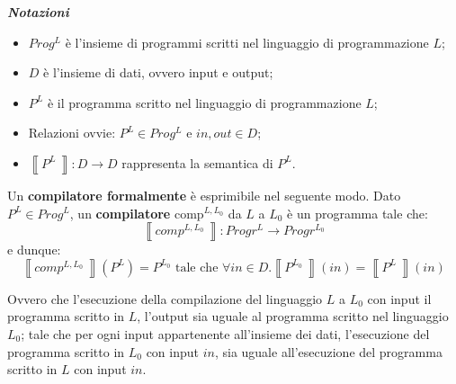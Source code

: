\documentclass[a4paper]{article}
\newcommand{\exec}[1]{\left\llbracket #1\:\right\rrbracket}
\begin{document}
	\noindent
	\begin{boxdef}
		\begin{center}
			\textcolor{Red3}{\textbf{\emph{Notazioni}}}
		\end{center}
		\begin{itemize}
			\item $Prog^{L}$ è l'insieme di programmi scritti nel linguaggio di programmazione $L$;
			\item $D$ è l'insieme di dati, ovvero input e output;
			\item $P^{L}$ è il programma scritto nel linguaggio di programmazione $L$;
			\item Relazioni ovvie: $P^{L} \in Prog^{L}$ e $in, out \in D$;
			\item $\exec{P^{L}}: D \longrightarrow D$ rappresenta la semantica di $P^{L}$.
		\end{itemize}
	\end{boxdef}\:\newline

	\noindent
	\begin{boxdef}
		Un \textcolor{Red3}{\textbf{compilatore formalmente}} è esprimibile nel seguente modo.\newline
		Dato $P^{L} \in Prog^{L}$, un \textbf{compilatore} $\mathrm{comp}^{L, L_{0}}$ da $L$ a $L_{0}$ è un programma tale che:
		\begin{equation*}
			\exec{comp^{L, L_{0}}}: Progr^{L} \longrightarrow Progr^{L_{0}}
		\end{equation*}
		e dunque:
		\begin{equation*}
			\exec{comp^{L, L_{0}}}\left(P^{L}\right) = P^{L_{0}} \text{ tale che } \forall in \in D. \exec{P^{L_{0}}}\left(in\right) = \exec{P^{L}}\left(in\right)
		\end{equation*}
	\end{boxdef}\:\newline
	
	\noindent
	Ovvero che l'esecuzione della compilazione del linguaggio $L$ a $L_{0}$ con input il programma scritto in $L$, l'output sia uguale al programma scritto nel linguaggio $L_{0}$; tale che per ogni input appartenente all'insieme dei dati, l'esecuzione del programma scritto in $L_{0}$ con input $in$, sia uguale all'esecuzione del programma scritto in $L$ con input $in$.\newpage
\end{document}
